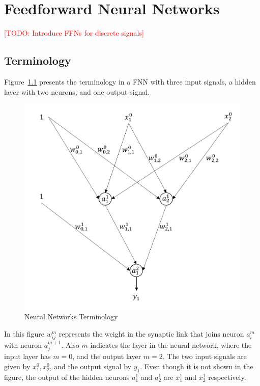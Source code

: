 
\chapter{Feedforward Neural Networks} %

\label{AppendixA} %

\textcolor{red} {[TODO: Introduce FFNs for discrete signals] }

\section{Terminology}

Figure~\ref{fig:Terminology} presents the terminology in a FNN with three input signals, a hidden layer with two neurons, and one output signal.

\begin{figure}[h]
	\centering
	\includegraphics{Figures/ffn_v1.PNG}
	\decoRule
	\caption[Neural Networks Terminology]{Neural Networks Terminology}
	\label{fig:Terminology}
\end{figure} 


In this figure $w^{m}_{ij}$ represents the weight in the synaptic link that joins neuron $a^{m}_{i}$ with neuron $a^{m+1}_{j}$. Also $m$ indicates the layer in the neural network, where the input layer has $m=0$, and the output layer $m=2$. The two input signals are given by $x^{0}_{1}, x^{0}_{2}$, and the output signal by $y_1$. Even though it is not shown in the figure, the output of the hidden neurons  $a^{1}_{1}$ and $a^{1}_{2}$ are $x^{1}_{1}$ and $x^{1}_{2}$ respectively.

